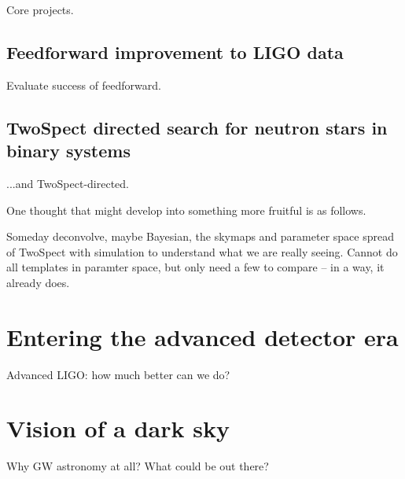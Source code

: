         Core projects.

        \subsection{Feedforward improvement to LIGO data}
        \label{feedforward_end}

            Evaluate success of feedforward.

        \subsection{TwoSpect directed search for neutron stars in binary systems}
        \label{TwoSpect_end}

            ...and TwoSpect-directed.

            One thought that might develop into something more fruitful is as follows.

            Someday deconvolve, maybe Bayesian, the skymaps and parameter space spread of TwoSpect with simulation to understand what we are really seeing. Cannot do all templates in paramter space, but only need a few to compare -- in a way, it already does.

    \section{Entering the advanced detector era}
    \label{advanced_detector_era}

        Advanced LIGO: how much better can we do?

    \section{Vision of a dark sky}
    \label{dark_sky}

        Why GW astronomy at all? What could be out there?

%
%
%


